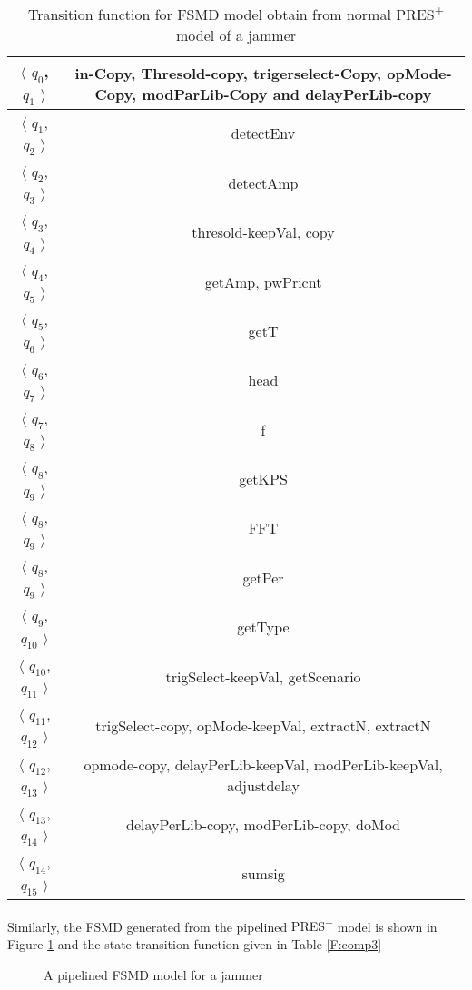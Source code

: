 \documentclass[9pt,executive]{article}
\def\presp{PRES\textsuperscript{+}}
\def\fsmd{FSMD}
\def\presp{PRES\textsuperscript{+}}
\def\fsmd{FSMD}
\begin{document}
\begin{table}[t]
\begin{center}
\begin{tabular}{|c|c|}
\hline
$\langle$ $q_0$, $q_1$ $\rangle$         &  in-Copy, Thresold-copy, trigerselect-Copy, opMode-Copy,  modParLib-Copy and delayPerLib-copy   \\ 
 \hline                                              
$\langle$ $q_1$, $q_2$ $\rangle$         &  detectEnv                                                                 \\ 
\hline
$\langle$ $q_2$, $q_3$ $\rangle$         &   detectAmp                                                                                  \\  
\hline
$\langle$ $q_3$, $q_4$ $\rangle$         &  thresold-keepVal, copy                                                                               \\    
\hline
$\langle$ $q_4$, $q_5$ $\rangle$         &  getAmp, pwPricnt                                                                              \\             
\hline
$\langle$ $q_5$, $q_6$ $\rangle$         & getT                           \\ 
\hline
$\langle$ $q_6$, $q_7$ $\rangle$         & head                                                                \\ 
\hline
$\langle$ $q_7$, $q_8$ $\rangle$          & f                                                                                                       \\
\hline 
$\langle$ $q_8$, $q_9$ $\rangle$         & getKPS            \\
\hline
$\langle$ $q_8$, $q_9$ $\rangle$          & FFT                      \\
\hline
$\langle$ $q_8$, $q_9$ $\rangle$          & getPer\\
\hline
$\langle$ $q_9$, $q_{10}$ $\rangle$        & getType \\
\hline 
$\langle$ $q_{10}$, $q_{11}$ $\rangle$       & trigSelect-keepVal, getScenario\\
\hline 
$\langle$ $q_{11}$, $q_{12}$ $\rangle$        &trigSelect-copy, opMode-keepVal, extractN, extractN \\
\hline 
$\langle$ $q_{12}$, $q_{13}$ $\rangle$         & opmode-copy, delayPerLib-keepVal, modPerLib-keepVal, adjustdelay\\
\hline 
$\langle$ $q_{13}$, $q_{14}$ $\rangle$          & delayPerLib-copy, modPerLib-copy, doMod\\
\hline
 $\langle$ $q_{14}$, $q_{15}$ $\rangle$         & sumsig\\
\hline
\end{tabular}
\end{center}
\caption{Transition function for {\fsmd} model obtain from normal {\presp} model of a jammer}
\label{F:comp1}
\end{table}
Similarly, the {\fsmd} generated from the pipelined {\presp} model  is shown in Figure \ref{fig:pjammer} and the 
state transition function given in Table \ref{F:comp3}
\begin{figure}[htbp]
\centerline{}
\caption{A pipelined {\fsmd} model for a jammer}
\label{fig:pjammer}
\end{figure}
\end{document}
